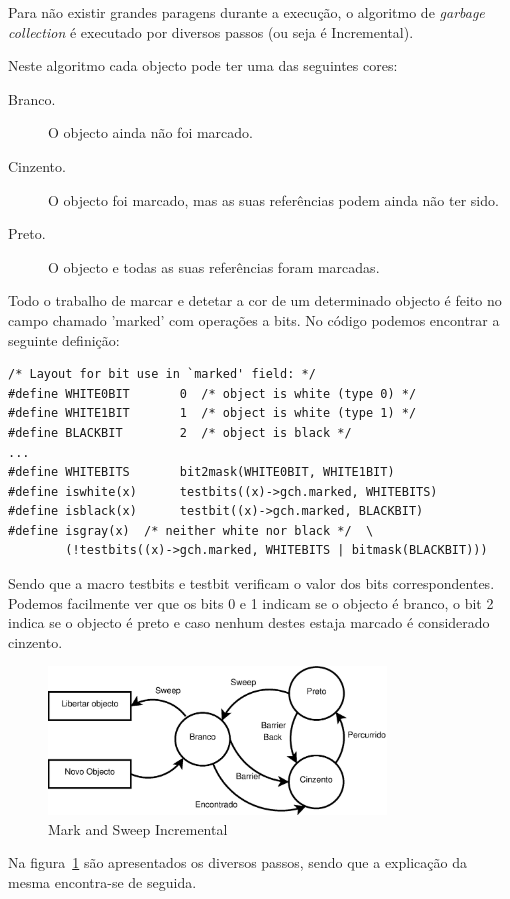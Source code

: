 \documentclass{article}
\begin{document}
Para não existir grandes paragens durante a execução, o algoritmo de \emph{garbage collection} é executado por diversos passos (ou seja é Incremental).

Neste algoritmo cada objecto pode ter uma das seguintes cores:
\begin{description}
\item[Branco.] O objecto ainda não foi marcado.
\item[Cinzento.] O objecto foi marcado, mas as suas referências podem ainda não ter sido.
\item[Preto.] O objecto e todas as suas referências foram marcadas.
\end{description}

Todo o trabalho de marcar e detetar a cor de um determinado objecto é feito no campo chamado 'marked' com operações a bits.
No código podemos encontrar a seguinte definição:
\begin{verbatim}
/* Layout for bit use in `marked' field: */
#define WHITE0BIT       0  /* object is white (type 0) */
#define WHITE1BIT       1  /* object is white (type 1) */
#define BLACKBIT        2  /* object is black */
...
#define WHITEBITS       bit2mask(WHITE0BIT, WHITE1BIT)
#define iswhite(x)      testbits((x)->gch.marked, WHITEBITS)
#define isblack(x)      testbit((x)->gch.marked, BLACKBIT)
#define isgray(x)  /* neither white nor black */  \
        (!testbits((x)->gch.marked, WHITEBITS | bitmask(BLACKBIT)))
\end{verbatim}
Sendo que a macro testbits e testbit verificam o valor dos bits correspondentes.
Podemos facilmente ver que os bits 0 e 1 indicam se o objecto é branco, o bit 2 indica se o objecto é preto e caso nenhum destes estaja marcado é considerado cinzento.

\begin{figure}[h!]
    \centering
    \includegraphics[width=0.8\textwidth]{GC-algoritm.eps}
    \caption{Mark and Sweep Incremental}
    \label{fig:marksweep}
\end{figure}

Na figura~\ref{fig:marksweep} são apresentados os diversos passos, sendo que a explicação da mesma encontra-se de seguida.
\end{document}
